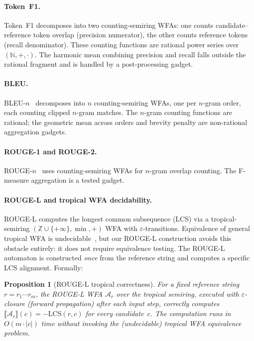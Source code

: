 \documentclass[11pt]{article}
\newtheorem{proposition}[theorem]{Proposition}
\newcommand{\N}{\mathbb{N}}
\newcommand{\Z}{\mathbb{Z}}
\newcommand{\wfa}{\mathcal{A}}
\begin{document}
\paragraph{Token~F1.}
Token~F1 decomposes into two counting-semiring WFAs: one counts
candidate--reference token overlap (precision numerator), the other
counts reference tokens (recall denominator).  These counting functions
are rational power series over $(\N,+,\cdot)$.  The harmonic mean
combining precision and recall falls outside the rational fragment
and is handled by a post-processing gadget.

\paragraph{BLEU.}
BLEU-$n$~\cite{papineni2002bleu} decomposes into $n$ counting-semiring
WFAs, one per $n$-gram order, each counting clipped $n$-gram matches.
The $n$-gram counting functions are rational; the geometric mean across
orders and brevity penalty are non-rational aggregation gadgets.

\paragraph{ROUGE-1 and ROUGE-2.}
ROUGE-$n$~\cite{lin2004rouge} uses counting-semiring WFAs for $n$-gram
overlap counting.  The F-measure aggregation is a tested gadget.

\paragraph{ROUGE-L and tropical WFA decidability.}
ROUGE-L computes the longest common subsequence (LCS) via a
tropical-semiring $(\Z\cup\{+\infty\},\min,+)$ WFA with
$\varepsilon$-transitions.
Equivalence of general tropical WFA is
undecidable~\cite{krob1994equality}, but our ROUGE-L construction
avoids this obstacle entirely: it does not require equivalence testing.
The ROUGE-L automaton is constructed \emph{once} from the reference
string and computes a specific LCS alignment.  Formally:

\begin{proposition}[ROUGE-L tropical correctness]\label{prop:rouge-l-unamb}
For a fixed reference string $r = r_1\cdots r_m$, the ROUGE-L WFA
$\wfa_r$ over the tropical semiring, executed with
$\varepsilon$-closure (forward propagation) after each input step,
correctly computes
$\llbracket\wfa_r\rrbracket(c) = -\mathrm{LCS}(r,c)$ for every
candidate~$c$.
The computation runs in $O(m\cdot|c|)$ time without invoking
the (undecidable) tropical WFA equivalence problem.
\end{proposition}
\end{document}

